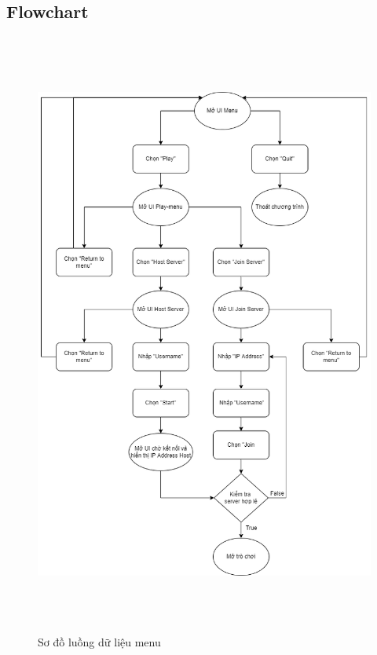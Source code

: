 \documentclass[a4paper]{article}
\begin{document}
\subsection{Flowchart}
\vspace{-20pt}
\begin{figure}[H]
    \includegraphics[width=14cm, height=20cm]{images/menu_flowchart.png}
    \caption*{Sơ đồ luồng dữ liệu menu}
\end{figure}
\end{document}
